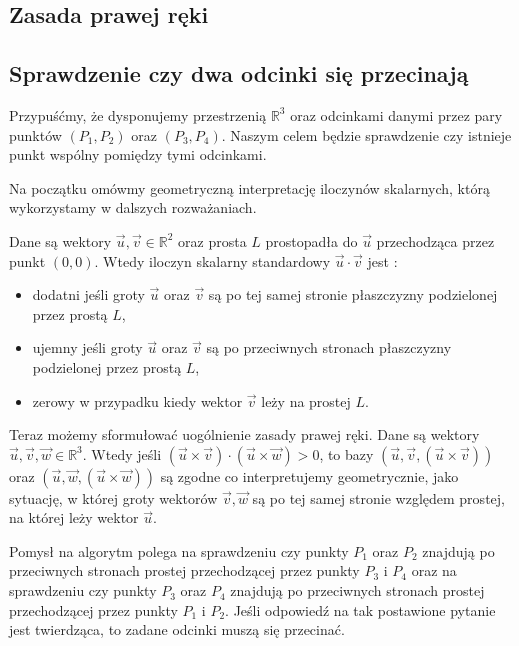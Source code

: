 \subsection{Zasada prawej ręki}

\subsection{Sprawdzenie czy dwa odcinki się przecinają}
Przypuśćmy, że dysponujemy przestrzenią $\mathbb{R}^3$ oraz odcinkami danymi przez pary punktów 
$(P_1, P_2)$ oraz $(P_3, P_4)$. Naszym celem będzie sprawdzenie
czy istnieje punkt wspólny pomiędzy tymi odcinkami.

Na początku omówmy geometryczną interpretację iloczynów skalarnych, którą wykorzystamy w dalszych rozważaniach.

Dane są wektory $\vec{u},\vec{v} \in \mathbb{R}^2$ oraz prosta $L$ prostopadła
do $\vec{u}$ przechodząca przez punkt $(0,0)$. Wtedy iloczyn skalarny 
standardowy $\vec{u} \cdot \vec{v}$
jest :
\begin{itemize}[]
	\item dodatni jeśli groty $\vec{u}$ oraz $\vec{v}$ są po tej samej stronie płaszczyzny podzielonej przez prostą $L$,
	\item ujemny jeśli groty $\vec{u}$ oraz $\vec{v}$ są po  przeciwnych stronach płaszczyzny podzielonej przez prostą $L$,
	\item zerowy w przypadku kiedy wektor $\vec{v}$
	leży na prostej $L$.
\end{itemize}

Teraz możemy sformułować uogólnienie zasady prawej ręki.
Dane są wektory $\vec{u},\vec{v},\vec{w} \in \mathbb{R}^3$.
Wtedy jeśli $(\vec{u} \times \vec{v})
\cdot (\vec{u} \times \vec{w}) > 0$, to bazy
$(\vec{u}, \vec{v},  (\vec{u} \times \vec{v}))$ oraz
$(\vec{u}, \vec{w},  (\vec{u} \times \vec{w}))$ są zgodne
co interpretujemy geometrycznie, jako sytuację, w której 
groty wektorów 
$\vec{v}, \vec{w}$ są po tej samej stronie względem prostej,
na której leży wektor $\vec{u}$.


Pomysł na algorytm polega na sprawdzeniu czy punkty $P_1$
oraz $P_2$ znajdują po przeciwnych stronach prostej 
przechodzącej przez punkty $P_3$ i $P_4$ oraz 
na sprawdzeniu czy punkty $P_3$
oraz $P_4$ znajdują po przeciwnych stronach prostej 
przechodzącej przez punkty $P_1$ i $P_2$. Jeśli odpowiedź
na tak postawione pytanie jest twierdząca, to zadane
odcinki muszą się przecinać.


